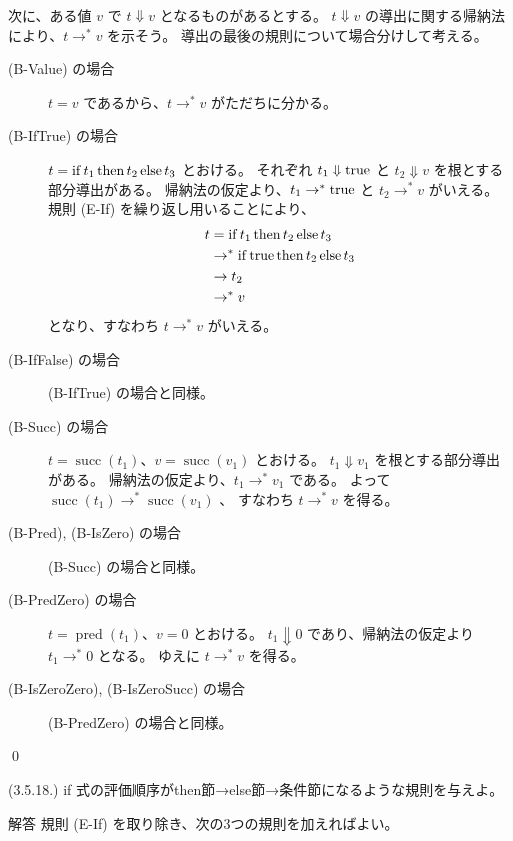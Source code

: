 \begin{jproof}
  次に、ある値 $v$ で $t \Downarrow v$ となるものがあるとする。
  $t \Downarrow v$ の導出に関する帰納法により、$t \to^* v$ を示そう。
  導出の最後の規則について場合分けして考える。
  \begin{description}
    \item[(B-Value) の場合]
      $t = v$ であるから、$t \to^* v$ がただちに分かる。
    \item[(B-IfTrue) の場合]
      $t = \operatorname{if} t_1 \operatorname{then} t_2 \operatorname{else} t_3$ とおける。
      それぞれ $t_1 \Downarrow \operatorname{true}$ と $t_2 \Downarrow v$ を根とする部分導出がある。
      帰納法の仮定より、$t_1 \to^* \operatorname{true}$ と $t_2 \to^* v$ がいえる。
      規則 (E-If) を繰り返し用いることにより、
      \begin{align*}
        t
        & = \operatorname{if} t_1 \operatorname{then} t_2 \operatorname{else} t_3
        \\ & \to^* \operatorname{if} \operatorname{true} \operatorname{then} t_2 \operatorname{else} t_3
        \\ & \to t_2
        \\ & \to^* v
      \end{align*}
      となり、すなわち $t \to^* v$ がいえる。
    \item[(B-IfFalse) の場合]
      (B-IfTrue) の場合と同様。
    \item[(B-Succ) の場合]
      $t = \operatorname{succ}(t_1)$、$v = \operatorname{succ}(v_1)$ とおける。
      $t_1 \Downarrow v_1$ を根とする部分導出がある。
      帰納法の仮定より、$t_1 \to^* v_1$ である。
      よって $\operatorname{succ}(t_1) \to^* \operatorname{succ}(v_1)$ 、
      すなわち $t \to^* v$ を得る。
    \item[(B-Pred), (B-IsZero) の場合]
      (B-Succ) の場合と同様。
    \item[(B-PredZero) の場合]
      $t = \operatorname{pred}(t_1)$、$v = 0$ とおける。
      $t_1 \Downarrow 0$ であり、帰納法の仮定より $t_1 \to^* 0$ となる。
      ゆえに $t \to^* v$ を得る。
    \item[(B-IsZeroZero), (B-IsZeroSucc) の場合]
      (B-PredZero) の場合と同様。
  \end{description}
  \qed
\end{jproof}

\begin{jexercise*}(3.5.18.)
  if 式の評価順序がthen節→else節→条件節になるような規則を与えよ。
\end{jexercise*}
\begin{itembox}[l]{解答}
  規則 (E-If) を取り除き、次の3つの規則を加えればよい。

  {
     \to {}
  }

  {
     \to {}
  }

  {
     \to {}
  }
\end{itembox}
